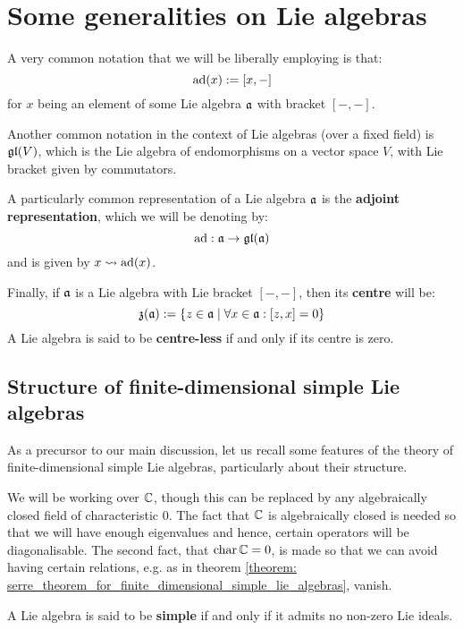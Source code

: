 \section{Some generalities on Lie algebras}
    \begin{convention}
        A very common notation that we will be liberally employing is that:
            $$\mathrm{ad}(x) := [x, -]$$
        for $x$ being an element of some Lie algebra $\mathfrak{a}$ with bracket $[-, -]$. 

        Another common notation in the context of Lie algebras (over a fixed field) is $\mathfrak{gl}(V)$, which is the Lie algebra of endomorphisms on a vector space $V$, with Lie bracket given by commutators.

        A particularly common representation of a Lie algebra $\mathfrak{a}$ is the \textbf{adjoint representation}, which we will be denoting by:
            $$\mathrm{ad}: \mathfrak{a} \to \mathfrak{gl}(\mathfrak{a})$$
        and is given by $x \leadsto \mathrm{ad}(x)$.

        Finally, if $\mathfrak{a}$ is a Lie algebra with Lie bracket $[-, -]$, then its \textbf{centre} will be:
            $$\mathfrak{z}(\mathfrak{a}) := \{ z \in \mathfrak{a} \mid \forall x \in \mathfrak{a}: [z, x] = 0 \}$$
        A Lie algebra is said to be \textbf{centre-less} if and only if its centre is zero.
    \end{convention}

    \subsection{Structure of finite-dimensional simple Lie algebras} \label{subsection: finite_dimensional_simple_lie_algebras}
        As a precursor to our main discussion, let us recall some features of the theory of finite-dimensional simple Lie algebras, particularly about their structure.

        We will be working over $\mathbb{C}$, though this can be replaced by any algebraically closed field of characteristic $0$. The fact that $\mathbb{C}$ is algebraically closed is needed so that we will have enough eigenvalues and hence, certain operators will be diagonalisable. The second fact, that $\operatorname{char} \mathbb{C} = 0$, is made so that we can avoid having certain relations, e.g. as in theorem \ref{theorem: serre_theorem_for_finite_dimensional_simple_lie_algebras}, vanish.

        \begin{definition}
            A Lie algebra is said to be \textbf{simple} if and only if it admits no non-zero Lie ideals. 
        \end{definition}

